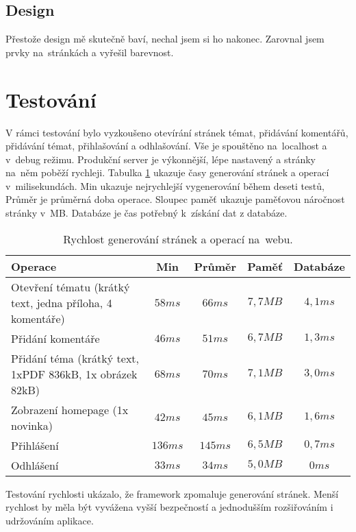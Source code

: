 \documentclass[thesis=B,czech]{FITthesis}[2012/06/26]
\begin{document}
\subsection{Design}

Přestože design mě skutečně baví, nechal jsem si ho nakonec. Zarovnal jsem prvky na~stránkách a vyřešil barevnost.

\section{Testování}

V rámci testování bylo vyzkoušeno otevírání stránek témat, přidávání komentářů, přidávání témat, přihlašování a odhlašování. Vše je spouštěno na~localhost a v~debug režimu. Produkční server je výkonnější, lépe nastavený a stránky na~něm poběží rychleji. Tabulka \ref{table:tests} ukazuje časy generování stránek a operací v~milisekundách. Min ukazuje nejrychlejší vygenerování během deseti testů, Průměr je průměrná doba operace. Sloupec paměť ukazuje paměťovou náročnost stránky v~MB. Databáze je čas potřebný k~získání dat z databáze.

\begin{table}
\centering
\begin{tabular}{| p{5cm} | c | c | c | c |}
  \hline
    \bfseries Operace & \bfseries Min & \bfseries Průměr & \bfseries Paměť & \bfseries Databáze \\
    \hline \hline

   Otevření tématu (krátký text, jedna příloha, 4 komentáře) & $58 ms$ & $66 ms$  & $7,7 MB$ & $4,1 ms$ \\
   \hline
   Přidání komentáře & $46ms$ &$ 51ms$  & $6,7MB$ & $1,3ms$ \\
   \hline
   Přidání téma (krátký text, 1xPDF 836kB, 1x obrázek 82kB) & $68ms$ &$ 70ms$  & $7,1MB$ & $3,0ms$ \\
   \hline
   Zobrazení homepage (1x novinka) & $42ms$ &$ 45ms$  & $6,1MB$ & $1,6ms$ \\
   \hline
   Přihlášení & $136ms$ &$ 145ms$  & $6,5MB$ & $0,7ms$ \\
   \hline
   Odhlášení & $33ms$ &$ 34ms$  & $5,0MB$ & $0ms$ \\

\hline    
\end{tabular}
\caption[Rychlost operací na~webu.]{Rychlost generování stránek a operací na~webu.}
\label{table:tests}
\end{table}

Testování rychlosti ukázalo, že framework zpomaluje generování stránek. Menší rychlost by měla být vyvážena vyšší bezpečností a jednodušším rozšiřováním i udržováním aplikace.
\end{document}
